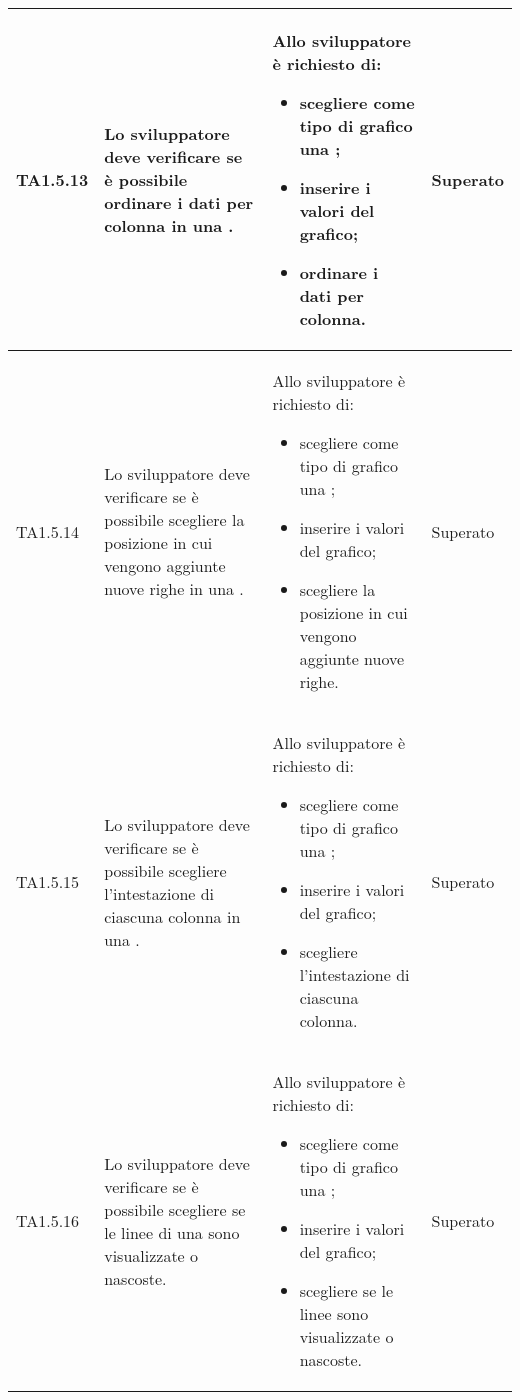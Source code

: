 \begin{longtabu}{| X[0.5] | X | X | X[0.5] |}
	TA1.5.13 & Lo sviluppatore deve verificare se è possibile ordinare i dati per colonna in una .

		& Allo sviluppatore è richiesto di:
		\begin{itemize}
			\item scegliere come tipo di grafico una ;
			\item inserire i valori del grafico;
			\item ordinare i dati per colonna.
		\end{itemize}
& Superato \\ \hline

	TA1.5.14 & Lo sviluppatore deve verificare se è possibile scegliere la posizione in cui vengono aggiunte nuove righe in una .

		& Allo sviluppatore è richiesto di:
		\begin{itemize}
			\item scegliere come tipo di grafico una ;
			\item inserire i valori del grafico;
			\item scegliere la posizione in cui vengono aggiunte nuove righe.
		\end{itemize}
& Superato \\ \hline

	TA1.5.15 & Lo sviluppatore deve verificare se è possibile scegliere l'intestazione di ciascuna colonna in una .

		& Allo sviluppatore è richiesto di:
		\begin{itemize}
			\item scegliere come tipo di grafico una ;
			\item inserire i valori del grafico;
			\item scegliere l'intestazione di ciascuna colonna.
		\end{itemize}
& Superato \\ \hline

	TA1.5.16 & Lo sviluppatore deve verificare se è possibile scegliere se le linee di una  sono visualizzate o nascoste.

		& Allo sviluppatore è richiesto di:
		\begin{itemize}
			\item scegliere come tipo di grafico una ;
			\item inserire i valori del grafico;
			\item scegliere se le linee sono visualizzate o nascoste.
		\end{itemize}
& Superato \\ \hline


\end{longtabu}
